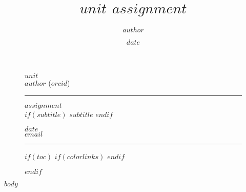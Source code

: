 \documentclass[10pt, a4paper, fleqn]{article}
\title{$unit$ $assignment$}
\date{$date$}
\author{$author$}
\begin{document}
	\thispagestyle{plain}
	\begin{figure}[!t]
		\begin{minipage}{0.295\textwidth} %
			\raggedright
			$unit$\\ %
			\footnotesize %
			$author$ ($orcid$) %
			\medskip\hrule
		\end{minipage}
		\begin{minipage}{0.4\textwidth} %
			\centering
			\large %
			$assignment$\\ %
			$if(subtitle)$
			\normalsize %
			$subtitle$ %
			$endif$
		\end{minipage}
		\begin{minipage}{0.295\textwidth} %
			\raggedleft
			$date$\\ %
			\footnotesize %
			\href{mailto:$email$}{$email$}%
			\medskip\hrule
		\end{minipage}
		$if(toc)$
		{
			$if(colorlinks)$
			\hypersetup{linkcolor=$if(toccolor)$$toccolor$$else$$endif$}
			$endif$
			\setcounter{tocdepth}{$toc-depth$}
			\tableofcontents
			}
			\listoffigures
			\listoftables
		$endif$
	\end{figure}
	$body$
\end{document}
